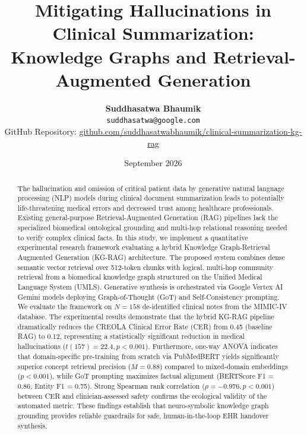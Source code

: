 \documentclass[11pt, a4paper]{article}
\title{\textbf{Mitigating Hallucinations in Clinical Summarization:\\Knowledge Graphs and Retrieval-Augmented Generation}}
\author{
  \textbf{Suddhasatwa Bhaumik} \\
  \texttt{suddhasatwa@google.com} \\
  \small GitHub Repository: \href{https://github.com/suddhasatwabhaumik/clinical-summarization-kg-rag}{github.com/suddhasatwabhaumik/clinical-summarization-kg-rag}
}
\date{September 2026}
\begin{document}
\maketitle

\begin{abstract}
The hallucination and omission of critical patient data by generative natural language processing (NLP) models during clinical document summarization leads to potentially life-threatening medical errors and decreased trust among healthcare professionals. Existing general-purpose Retrieval-Augmented Generation (RAG) pipelines lack the specialized biomedical ontological grounding and multi-hop relational reasoning needed to verify complex clinical facts. In this study, we implement a quantitative experimental research framework evaluating a hybrid Knowledge Graph-Retrieval Augmented Generation (KG-RAG) architecture. The proposed system combines dense semantic vector retrieval over 512-token chunks with logical, multi-hop community retrieval from a biomedical knowledge graph structured on the Unified Medical Language System (UMLS). Generative synthesis is orchestrated via Google Vertex AI Gemini models deploying Graph-of-Thought (GoT) and Self-Consistency prompting. We evaluate the framework on $N = 158$ de-identified clinical notes from the MIMIC-IV database. The experimental results demonstrate that the hybrid KG-RAG pipeline dramatically reduces the CREOLA Clinical Error Rate (CER) from 0.45 (baseline RAG) to 0.12, representing a statistically significant reduction in medical hallucinations ($t(157) = 22.4, p < 0.001$). Furthermore, one-way ANOVA indicates that domain-specific pre-training from scratch via PubMedBERT yields significantly superior concept retrieval precision ($M = 0.88$) compared to mixed-domain embeddings ($p < 0.001$), while GoT prompting maximizes factual alignment (BERTScore F1 = 0.86, Entity F1 = 0.75). Strong Spearman rank correlation ($\rho = -0.976, p < 0.001$) between CER and clinician-assessed safety confirms the ecological validity of the automated metric. These findings establish that neuro-symbolic knowledge graph grounding provides reliable guardrails for safe, human-in-the-loop EHR handover synthesis.
\end{abstract}
\end{document}
